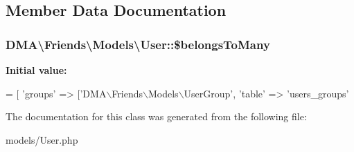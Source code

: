 \subsection{Member Data Documentation}
\hypertarget{classDMA_1_1Friends_1_1Models_1_1User_af33f5b53bdb9a5e3156fd5c8ab53785b}{
\subsubsection[{\$belongs\+To\+Many}]{\setlength{\rightskip}{0pt plus 5cm}D\+M\+A\textbackslash{}\+Friends\textbackslash{}\+Models\textbackslash{}\+User\+::\$belongs\+To\+Many}}\label{classDMA_1_1Friends_1_1Models_1_1User_af33f5b53bdb9a5e3156fd5c8ab53785b}
{\bfseries Initial value\+:}
\begin{DoxyCode}
= [
        \textcolor{stringliteral}{'groups'} => [\textcolor{stringliteral}{'DMA\(\backslash\)Friends\(\backslash\)Models\(\backslash\)UserGroup'}, \textcolor{stringliteral}{'table'} => \textcolor{stringliteral}{'users\_groups'}
\end{DoxyCode}


The documentation for this class was generated from the following file\+:\begin{DoxyCompactItemize}
\item 
models/User.\+php\end{DoxyCompactItemize}
